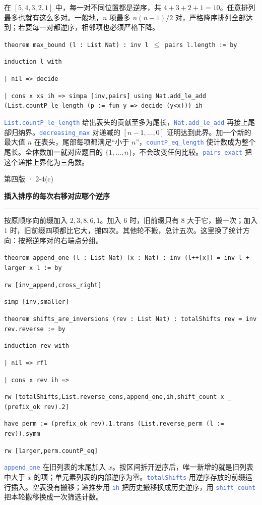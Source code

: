 \documentclass[UTF8,11pt,a4paper,fontset=fandol]{ctexart}
\newcommand{\HandoutLesson}[2]{%
  \par{\small\heiti\color{BrickRed}#1}\par\vspace{3pt}
  {\fontsize{21}{27}\selectfont\heiti\bfseries #2}\par
  \textcolor{BrickRed}{\rule{\linewidth}{.7pt}}\par}
\newcommand{\src}[1]{\textcolor{RoyalBlue}{\texttt{#1}}}
\newenvironment{leanblock}{\par\smallskip\noindent\begin{lrbox}{\leanbox}\begin{minipage}{\dimexpr\linewidth-12pt\relax}\raggedright\small\setlength{\parskip}{0pt}}{\end{minipage}\end{lrbox}\colorbox{RoyalBlue!6}{\usebox{\leanbox}}\par\smallskip}
\newcommand{\lineofcode}[2]{\noindent\hspace*{#1em}\strut\texttt{#2}\par}
\begin{document}
在 $[5,4,3,2,1]$ 中，每一对不同位置都是逆序，共 $4+3+2+1=10$。任意排列最多也就有这么多对。一般地，$n$ 项最多 $n(n-1)/2$ 对，严格降序排列全部达到；若要每一对都逆序，相邻项也必须严格下降。
\begin{leanblock}
\lineofcode{0.0}{theorem max\_bound (l : List Nat) : inv l \ensuremath{\leq} pairs l.length := by}
\lineofcode{0.9}{induction l with}
\lineofcode{0.9}{| nil => decide}
\lineofcode{0.9}{| cons x xs ih => simpa [inv,pairs] using Nat.add\_le\_add (List.countP\_le\_length (p := fun y => decide (y<x))) ih}
\end{leanblock}
\src{List.countP\_le\_length} 给出表头的贡献至多为尾长，\src{Nat.add\_le\_add} 再接上尾部归纳界。\src{decreasing\_max} 对递减的 $[n-1,\dots,0]$ 证明达到此界。加一个新的最大值 $n$ 在表头，尾部每项都满足“小于 $n$”，\src{countP\_eq\_length} 使计数成为整个尾长。全体数加一就对应题目的 $\{1,\dots,n\}$，不会改变任何比较。\src{pairs\_exact} 把这个递推上界化为三角数。
\par{}
\clearpage{}\label{p48}\HandoutLesson{第四版 · 2-4(c)}{插入排序的每次右移对应哪个逆序}
按原顺序向前缀加入 $2,3,8,6,1$。加入 $6$ 时，旧前缀只有 $8$ 大于它，搬一次；加入 $1$ 时，旧前缀四项都比它大，搬四次。其他轮不搬，总计五次。这里换了统计方向：按照逆序对的右端点分组。
\begin{leanblock}
\lineofcode{0.0}{theorem append\_one (l : List Nat) (x : Nat) : inv (l++[x]) = inv l + larger x l := by}
\lineofcode{0.9}{rw [inv\_append,cross\_right]}
\lineofcode{0.9}{simp [inv,smaller]}
\end{leanblock}
\begin{leanblock}
\lineofcode{0.0}{theorem shifts\_are\_inversions (rev : List Nat) : totalShifts rev = inv rev.reverse := by}
\lineofcode{0.9}{induction rev with}
\lineofcode{0.9}{| nil => rfl}
\lineofcode{0.9}{| cons x rev ih =>}
\lineofcode{1.8}{rw [totalShifts,List.reverse\_cons,append\_one,ih,shift\_count x \_ (prefix\_ok rev).2]}
\lineofcode{1.8}{have perm := (prefix\_ok rev).1.trans (List.reverse\_perm (l := rev)).symm}
\lineofcode{1.8}{rw [larger,perm.countP\_eq]}
\end{leanblock}
\src{append\_one} 在旧列表的末尾加入 $x$。按区间拆开逆序后，唯一新增的就是旧列表中大于 $x$ 的项；单元素列表的内部逆序为零。\src{totalShifts} 用逆序存放的前缀运行插入。空表没有搬移；递推步用 \src{ih} 把历史搬移换成历史逆序，用 \src{shift\_count} 把本轮搬移换成一次筛选计数。
\end{document}
